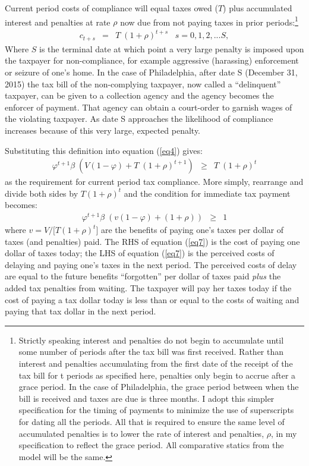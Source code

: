 Current period costs of compliance will equal taxes owed ($T$) plus
accumulated interest and penalties at rate $\rho$ now due from not
paying taxes in prior periods:\footnote{Strictly speaking interest and
  penalties do not begin to accumulate until some number of periods
  after the tax bill was first received. Rather than interest and
  penalties accumulating from the first date of the receipt of the tax
  bill for t periods as specified here, penalties only begin to accrue
  after a grace period.  In the case of Philadelphia, the grace period
  between when the bill is received and taxes are due is three months.
  I adopt this simpler specification for the timing of payments to
  minimize the use of superscripts for dating all the periods. All
  that is required to ensure the same level of accumulated penalties
  is to lower the rate of interest and penalties, $\rho$, in my
  specification to reflect the grace period. All comparative statics
  from the model will be the same. }
\begin{eqnarray}\label{eq5}
c_{t+s} &=& T \; (1 + \rho)^{t+s} \; \; \; s=0,1,2,...S,
\end{eqnarray}
Where $S$ is the terminal date at which point a very large penalty is
imposed upon the taxpayer for non-compliance, for example aggressive
(harassing) enforcement or seizure of one's home. In the case of
Philadelphia, after date S (December 31, 2015) the tax bill of the
non-complying taxpayer, now called a ``delinquent'' taxpayer, can be given to a collection agency and the
agency becomes the enforcer of payment. That agency can obtain a
court-order to garnish wages of the violating taxpayer. As date S
approaches the likelihood of compliance increases because of this very
large, expected penalty.

Substituting this definition into equation (\ref{eq4}) gives:  
\begin{eqnarray}\label{eq6}
\varphi^{t+1} \beta \; (V (1-\varphi) + T \; (1 + \rho)^{t+1}) &\ge&
  T \; (1 + \rho)^{t}
\end{eqnarray}
as the requirement for current period tax compliance.  More simply,
rearrange and divide both sides by $T(1 + \rho)^{t}$ and the condition
for immediate tax payment becomes:
\begin{eqnarray}\label{eq7}
\varphi^{t+1} \beta \;  (v (1-\varphi) +  (1 + \rho))  &\ge&   1
\end{eqnarray}
where $v = V/[T(1 + \rho)^{t}$] are the benefits of paying one's taxes
per dollar of taxes (and penalties) paid.  The RHS of equation
(\ref{eq7}) is the cost of paying one dollar of taxes today; the LHS
of equation (\ref{eq7}) is the perceived costs of delaying and paying
one's taxes in the next period.  The perceived costs of delay are
equal to the future benefits ``forgotten'' per dollar of taxes paid
\textit{plus} the added tax penalties from waiting.  The taxpayer will
pay her taxes today if the cost of paying a tax dollar today is less
than or equal to the costs of waiting and paying that tax dollar in
the next period.

